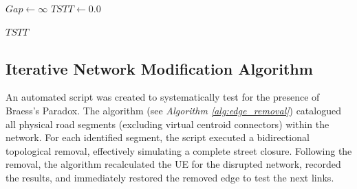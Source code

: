 \begin{algorithm}[htbp]
\small
\caption{Frank-Wolfe Algorithm for Traffic Assignment}
\label{alg:frank_wolfe}

\BlankLine

$Gap \gets \infty$\;
$TSTT \gets 0.0$\;

\BlankLine


\Return $TSTT$
\end{algorithm}





\subsection{Iterative Network Modification Algorithm}
\label{sec:inm_algo}

An automated script was created to systematically test for the presence of Braess's Paradox. The algorithm (see \textit{Algorithm \ref{alg:edge_removal}}) catalogued all physical road segments (excluding virtual centroid connectors) within the network. For each identified segment, the script executed a bidirectional topological removal, effectively simulating a complete street closure. Following the removal, the algorithm recalculated the UE for the disrupted network, recorded the results, and immediately restored the removed edge to test the next links.

